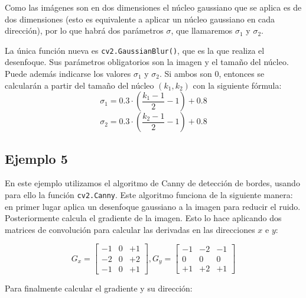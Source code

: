 \documentclass[a4paper,openright, 12pt]{book}
\begin{document}
Como las imágenes son en dos dimensiones el núcleo gaussiano que se aplica es de dos dimensiones (esto es equivalente a aplicar un núcleo gaussiano en cada dirección), por lo que habrá dos parámetros $\sigma$, que llamaremos $\sigma_1$ y $\sigma_2$.

La única función nueva es 
\lstinline|cv2.GaussianBlur()|, que es la que realiza el desenfoque.
Sus parámetros obligatorios son la imagen y el tamaño del núcleo. Puede además indicarse los valores $\sigma_1$ y $\sigma_2$. Si ambos son 0, entonces se calcularán a partir del tamaño del núcleo $(k_1, k_2)$ con la siguiente fórmula:
\begin{equation*}
\sigma_1 = 0.3\cdot(\frac{k_1-1}{2} - 1) + 0.8
\end{equation*}
\begin{equation*}
\sigma_2 = 0.3\cdot(\frac{k_2-1}{2} - 1) + 0.8
\end{equation*}



\newpage

\subsection*{Ejemplo 5} \label{derivadas}
En este ejemplo utilizamos el algoritmo de Canny \cite{canny86} de detección de bordes, usando para ello la función \lstinline|cv2.Canny|.
 Este algoritmo funciona de la siguiente manera: en primer lugar aplica un desenfoque gaussiano a la imagen para reducir el ruido. Posteriormente calcula el gradiente de la imagen. Esto lo hace aplicando dos matrices de convolución para calcular las derivadas en las direcciones $x$ e $y$:

\begin{equation*}
G_{x} = \begin{bmatrix} -1 & 0 & +1 \\ -2 & 0 & +2 \\ -1 & 0 & +1 \end{bmatrix},  G_{y} = \begin{bmatrix} -1 & -2 & -1 \\ 0 & 0 & 0 \\ +1 & +2 & +1 \end{bmatrix}
\end{equation*}

Para finalmente calcular el gradiente y su dirección:
\end{document}
